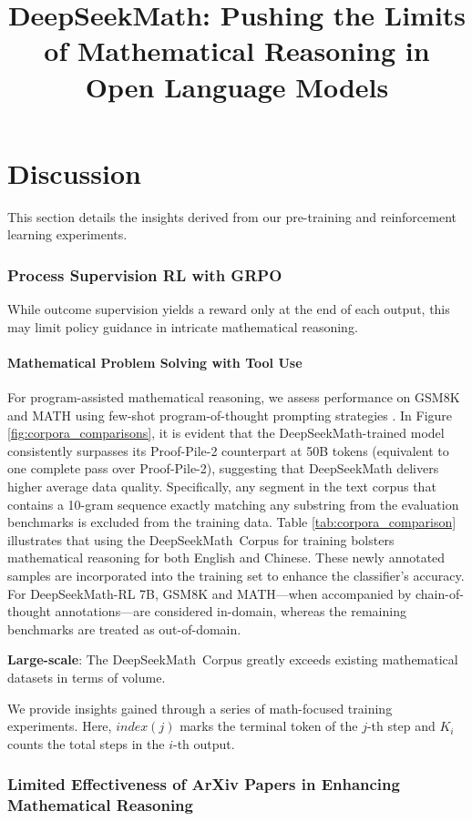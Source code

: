 \title{DeepSeekMath: Pushing the Limits of Mathematical Reasoning in Open Language Models}
\section{Discussion}
This section details the insights derived from our pre-training and reinforcement learning experiments. \subsubsection{Process Supervision RL with GRPO} While outcome supervision yields a reward only at the end of each output, this may limit policy guidance in intricate mathematical reasoning. \paragraph{Mathematical Problem Solving with Tool Use} For program-assisted mathematical reasoning, we assess performance on GSM8K and MATH using few-shot program-of-thought prompting strategies \citep{pot,pal}. In Figure \ref{fig:corpora_comparisons}, it is evident that the DeepSeekMath-trained model consistently surpasses its Proof-Pile-2 counterpart at 50B tokens (equivalent to one complete pass over Proof-Pile-2), suggesting that DeepSeekMath delivers higher average data quality. Specifically, any segment in the text corpus that contains a 10-gram sequence exactly matching any substring from the evaluation benchmarks is excluded from the training data. Table \ref{tab:corpora_comparison} illustrates that using the DeepSeekMath~Corpus for training bolsters mathematical reasoning for both English and Chinese. These newly annotated samples are incorporated into the training set to enhance the classifier’s accuracy. For DeepSeekMath-RL 7B, GSM8K and MATH—when accompanied by chain-of-thought annotations—are considered in-domain, whereas the remaining benchmarks are treated as out-of-domain. \item \textbf{Large-scale}:
    The DeepSeekMath~Corpus greatly exceeds existing mathematical datasets in terms of volume. \item We provide insights gained through a series of math-focused training experiments. Here, $index(j)$ marks the terminal token of the $j$-th step and $K_i$ counts the total steps in the $i$-th output. \subsubsection{Limited Effectiveness of ArXiv Papers in Enhancing Mathematical Reasoning}


